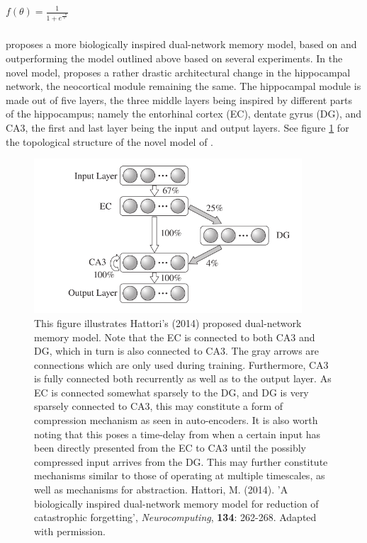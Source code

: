 \begin{center}
\begin{math}
    f(\theta) = \frac{1}{1 + e^{\frac{-\theta}{\epsilon}}}
\end{math}
\end{center}

\subsubsection{\cite{Hattori2014}}
\cite{Hattori2014} proposes a more biologically inspired dual-network memory model, based on and outperforming the model outlined above based on several experiments. In the novel model, \cite{Hattori2014} proposes a rather drastic architectural change in the hippocampal network, the neocortical module remaining the same. The hippocampal module is made out of five layers, the three middle layers being inspired by different parts of the hippocampus; namely the entorhinal cortex (EC), dentate gyrus (DG), and CA3, the first and last layer being the input and output layers. See figure \ref{fig:hattori_2014_model} for the topological structure of the novel model of \cite{Hattori2014}.

\begin{figure}
\centering
\includegraphics[width=10cm]{fig/hattori2014_hpc_module}
\caption{This figure illustrates Hattori's (2014) proposed dual-network memory model. Note that the EC is connected to both CA3 and DG, which in turn is also connected to CA3. The gray arrows are connections which are only used during training. Furthermore, CA3 is fully connected both recurrently as well as to the output layer. As EC is connected somewhat sparsely to the DG, and DG is very sparsely connected to CA3, this may constitute a form of compression mechanism as seen in auto-encoders. It is also worth noting that this poses a time-delay from when a certain input has been directly presented from the EC to CA3 until the possibly compressed input arrives from the DG. This may further constitute mechanisms similar to those of operating at multiple timescales, as well as mechanisms for abstraction.
Hattori, M. (2014). 'A biologically inspired dual-network memory model for reduction of catastrophic forgetting', \textit{Neurocomputing}, \textbf{134}: 262-268. Adapted with permission.}
\label{fig:hattori_2014_model}
\end{figure}

